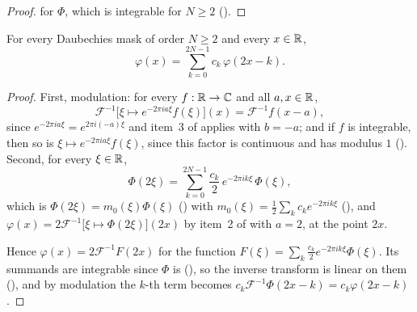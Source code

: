 \begin{proof}
\leanok
{}
 for $\Phi$, which is integrable for $N \geq 2$
().
\end{proof}

\begin{theorem}
\label{thm:daub-refinement-equation}
\leanok
{}
For every Daubechies mask of order $N \geq 2$ and every $x \in \mathbb{R}$,
\[
  \varphi(x) = \sum_{k=0}^{2N-1} c_k \, \varphi(2x - k) .
\]
\end{theorem}

\begin{proof}
\leanok
{}
First, modulation: for every $f : \mathbb{R} \to \mathbb{C}$ and all $a, x \in \mathbb{R}$,
\[
  \mathcal F^{-1}\bigl[\xi \mapsto e^{-2\pi i a \xi} f(\xi)\bigr](x) = \mathcal F^{-1} f(x - a) ,
\]
since $e^{-2\pi i a \xi} = e^{2\pi i (-a) \xi}$ and item~3 of 
applies with $b = -a$; and if $f$ is integrable, then so is
$\xi \mapsto e^{-2\pi i a \xi} f(\xi)$, since this factor is continuous and has modulus $1$
(). Second, for every $\xi \in \mathbb{R}$,
\[
  \Phi(2\xi) = \sum_{k=0}^{2N-1} \frac{c_k}{2} \, e^{-2\pi i k \xi} \, \Phi(\xi) ,
\]
which is $\Phi(2\xi) = m_0(\xi) \Phi(\xi)$ () with
$m_0(\xi) = \frac12 \sum_k c_k e^{-2\pi i k \xi}$ (), and
$\varphi(x) = 2 \mathcal F^{-1}\bigl[\xi \mapsto \Phi(2\xi)\bigr](2x)$ by item~2 of
 with $a = 2$, at the point $2x$.

Hence $\varphi(x) = 2 \mathcal F^{-1} F(2x)$ for the function
$F(\xi) = \sum_k \frac{c_k}{2} e^{-2\pi i k \xi} \Phi(\xi)$. Its summands are integrable since
$\Phi$ is (), so the inverse transform is linear on
them (), and by modulation the $k$-th term becomes
$c_k \mathcal F^{-1} \Phi(2x - k) = c_k \varphi(2x - k)$.
\end{proof}

